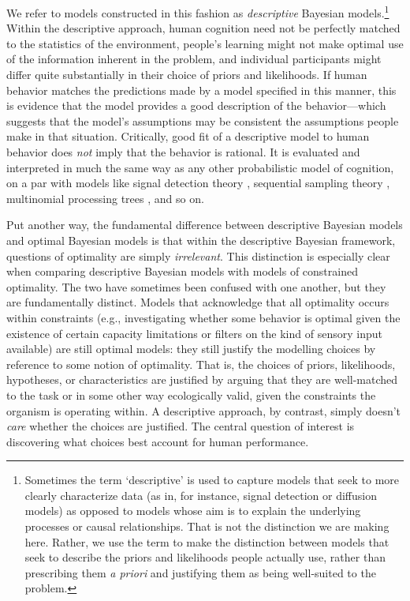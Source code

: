 We refer to models constructed in this fashion as {\it descriptive} Bayesian models.\footnote{Sometimes the term `descriptive' is used to capture models that seek to more clearly characterize data (as in, for instance, signal detection or diffusion models) as opposed to models whose aim is to explain the underlying processes or causal relationships. That is not the distinction we are making here. Rather, we use the term to make the distinction between models that seek to describe the priors and likelihoods people actually use, rather than prescribing them {\it a priori} and justifying them as being well-suited to the problem.} Within the descriptive approach, human cognition need not be perfectly matched to the statistics of the environment, people's learning might not make optimal use of the information inherent in the problem, and individual participants might differ quite substantially in their choice of priors and likelihoods. If human behavior matches the predictions made by a model specified in this manner, this is evidence that the model provides a good description of the behavior---which suggests that the model's assumptions may be consistent the assumptions people make in that situation. Critically, good fit of a descriptive model to human behavior does {\it not} imply that the behavior is rational. It is evaluated and interpreted in much the same way as any other probabilistic model of cognition, on a par with models like signal detection theory \cite{macmillan_detection_2004}, sequential sampling theory \cite{ratcliff_comparison_2004}, multinomial processing trees \cite{batchelder_multinomial_1990}, and so on. 

Put another way, the fundamental difference between descriptive Bayesian models and optimal Bayesian models is that within the descriptive Bayesian framework, questions of optimality are simply {\it irrelevant}. This distinction is especially clear when comparing descriptive Bayesian models with models of constrained optimality. The two have sometimes been confused with one another, but they are fundamentally distinct. Models that acknowledge that all optimality occurs within constraints (e.g., investigating whether some behavior is optimal given the existence of certain capacity limitations or filters on the kind of sensory input available) are still optimal models: they still justify the modelling choices by reference to some notion of optimality. That is, the choices of priors, likelihoods, hypotheses, or characteristics are justified by arguing that they are well-matched to the task or in some other way ecologically valid, given the constraints the organism is operating within. A descriptive approach, by contrast, simply doesn't {\it care} whether the choices are justified. The central question of interest is discovering what choices best account for human performance. 

